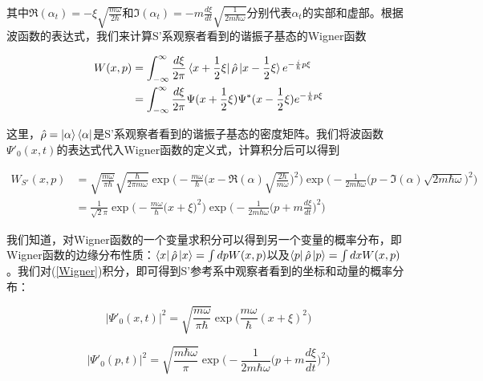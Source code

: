 \documentclass[a4paper]{article}
\begin{document}
        其中$\Re(\alpha_t)=-\xi\sqrt{\frac{m\omega}{2\hbar}}$和$\Im(\alpha_t)=-m\frac{d\xi}{dt}\sqrt{\frac{1}{2m\hbar\omega}}$分别代表$\alpha_t$的实部和虚部。根据波函数的表达式，我们来计算S'系观察者看到的谐振子基态的Wigner函数

        \begin{equation}
            \begin{split}
                W(x, p) &= \int_{-\infty}^\infty \frac{d\xi}{2\pi}\bra{x+\frac{1}{2}\xi}\hat{\rho}\ket{x-\frac{1}{2}\xi} e^{-\frac{i}{\hbar}p\xi} \\
                    &= \int_{-\infty}^\infty\frac{d\xi}{2\pi} \Psi(x+\frac{1}{2}\xi)\Psi^*(x-\frac{1}{2}\xi) e^{-\frac{i}{\hbar}p\xi}
            \end{split}
        \end{equation}

        这里，$\hat{\rho}=\ket{\alpha}\bra{\alpha}$是S'系观察者看到的谐振子基态的密度矩阵。我们将波函数$\Psi'_0(x,t)$的表达式代入Wigner函数的定义式，计算积分后可以得到

        \begin{equation}\label{Wigner}
            \begin{split}
                W_{S'}(x, p) &= \sqrt{\frac{m\omega}{\pi\hbar}} \sqrt{\frac{\hbar}{2\pi m\omega}} \exp\biggl(-\frac{m\omega}{\hbar}\bigl(x-\Re(\alpha)\sqrt{\frac{2\hbar}{m\omega}}\bigr)^2\biggr) \exp\biggl(-\frac{1}{2m\hbar\omega}\bigl(p-\Im(\alpha)\sqrt{2m\hbar\omega}\bigr)^2\biggr) \\
                    &= \frac{1}{\sqrt{2}\pi} \exp\biggl(-\frac{m\omega}{\hbar}\bigl(x+\xi\bigr)^2\biggr) \exp\biggl(-\frac{1}{2m\hbar\omega}\bigl(p+m\frac{d\xi}{dt}\bigr)^2\biggr)
            \end{split}
        \end{equation}

        我们知道，对Wigner函数的一个变量求积分可以得到另一个变量的概率分布，即Wigner函数的边缘分布性质：$\bra{x}\hat{\rho}\ket{x}=\int dp W(x, p)$以及$\bra{p}\hat{\rho}\ket{p}=\int dx W(x, p)$。我们对(\ref{Wigner})积分，即可得到S'参考系中观察者看到的坐标和动量的概率分布：

        \begin{equation}
            |\Psi'_0(x,t)|^2 = \sqrt{\frac{m\omega}{\pi\hbar}} \exp\bigg(\frac{m\omega}{\hbar}(x+\xi)^2\bigg)
        \end{equation}

        \begin{equation}
            |\Psi'_0(p,t)|^2 = \sqrt{\frac{m\hbar\omega}{\pi}} \exp\biggl(-\frac{1}{2m\hbar\omega}\bigl(p+m\frac{d\xi}{dt}\bigr)^2\biggr)
        \end{equation}
        
\end{document}
